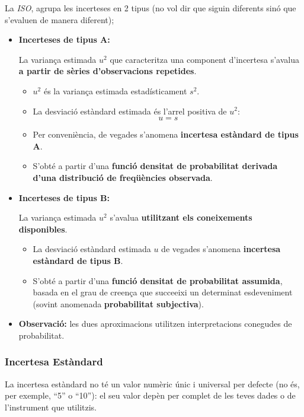 \documentclass[12pt]{article}
\begin{document}
La \textit{ISO}, agrupa les incerteses en 2 tipus (no vol dir que siguin diferents sinó que s'evaluen de manera diferent);

\begin{itemize}
    \item \textbf{Incerteses de tipus A:}

    La variança estimada $u^2$ que caracteritza una component d'incertesa s'avalua \textbf{a partir de sèries d'observacions repetides}.

    \begin{itemize}
        \item $u^2$ és la variança estimada estadísticament $s^2$.
        \item La desviació estàndard estimada és l'arrel positiva de $u^2$:
        \[
            u = s
        \]
        \item Per conveniència, de vegades s'anomena \textbf{incertesa estàndard de tipus A}.
        \item S'obté a partir d'una \textbf{funció densitat de probabilitat derivada d'una distribució de freqüències observada}.
    \end{itemize}

    \item \textbf{Incerteses de tipus B:}

    La variança estimada $u^2$ s'avalua \textbf{utilitzant els coneixements disponibles}.

    \begin{itemize}
        \item La desviació estàndard estimada $u$ de vegades s'anomena \textbf{incertesa estàndard de tipus B}.
        \item S'obté a partir d'una \textbf{funció densitat de probabilitat assumida}, basada en el grau de creença que succeeixi un determinat esdeveniment (sovint anomenada \textbf{probabilitat subjectiva}).
    \end{itemize}

    \item \textbf{Observació:} les dues aproximacions utilitzen interpretacions conegudes de probabilitat.
\end{itemize}

\subsubsection{Incertesa Estàndard}

La incertesa estàndard no té un valor numèric únic i universal per defecte (no és, per exemple, ``5'' o ``10''): el seu valor depèn per complet de les teves dades o de l'instrument que utilitzis.
\end{document}
